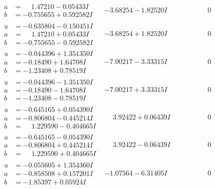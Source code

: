\documentclass[1p]{elsarticle_modified}
\theoremstyle{definition}
\begin{document}
$$\begin{array}{c|c|c}
\begin{aligned}
a &= \phantom{-}1.47210 - 0.05433 I \\
b &= -0.755655 + 0.592582 I\end{aligned}
 & -3.68254 - 1.82520 I & \phantom{-0.000000 } 0 \\ \hline\begin{aligned}
u &= -0.635804 - 0.150451 I \\
a &= \phantom{-}1.47210 + 0.05433 I \\
b &= -0.755655 - 0.592582 I\end{aligned}
 & -3.68254 + 1.82520 I & \phantom{-0.000000 } 0 \\ \hline\begin{aligned}
u &= -0.044396 + 1.351350 I \\
a &= -0.18490 + 1.64708 I \\
b &= -1.23408 + 0.78519 I\end{aligned}
 & -7.00217 - 3.33315 I & \phantom{-0.000000 } 0 \\ \hline\begin{aligned}
u &= -0.044396 - 1.351350 I \\
a &= -0.18490 - 1.64708 I \\
b &= -1.23408 - 0.78519 I\end{aligned}
 & -7.00217 + 3.33315 I & \phantom{-0.000000 } 0 \\ \hline\begin{aligned}
u &= -0.645165 + 0.054390 I \\
a &= -0.806804 - 0.445214 I \\
b &= \phantom{-}1.229590 - 0.404665 I\end{aligned}
 & \phantom{-}3.92422 + 0.06439 I & \phantom{-0.000000 } 0 \\ \hline\begin{aligned}
u &= -0.645165 - 0.054390 I \\
a &= -0.806804 + 0.445214 I \\
b &= \phantom{-}1.229590 + 0.404665 I\end{aligned}
 & \phantom{-}3.92422 - 0.06439 I & \phantom{-0.000000 } 0 \\ \hline\begin{aligned}
u &= -0.055605 + 1.354360 I \\
a &= -0.858508 + 0.157201 I \\
b &= -1.85397 + 0.05924 I\end{aligned}
 & -1.07564 - 6.31405 I & \phantom{-0.000000 } 0 \\ \hline\begin{aligned}

\end{aligned}
\end{array}$$
\end{document}
